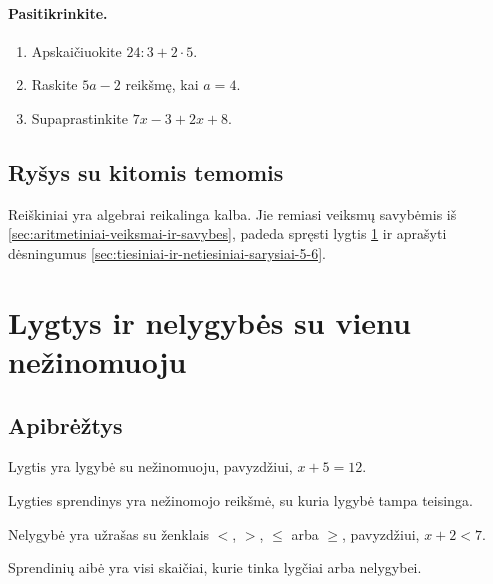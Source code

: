 \paragraph{Pasitikrinkite.}
\begin{enumerate}[label=\arabic*.]
\item Apskaičiuokite \(24:3+2\cdot 5\).
\item Raskite \(5a-2\) reikšmę, kai \(a=4\).
\item Supaprastinkite \(7x-3+2x+8\).
\end{enumerate}

\subsection{Ryšys su kitomis temomis}
Reiškiniai yra algebrai reikalinga kalba. Jie remiasi veiksmų savybėmis iš \ref{sec:aritmetiniai-veiksmai-ir-savybes}, padeda spręsti lygtis \ref{sec:lygtys-ir-nelygybes-su-vienu-nezinomuoju} ir aprašyti dėsningumus \ref{sec:tiesiniai-ir-netiesiniai-sarysiai-5-6}.

\section{Lygtys ir nelygybės su vienu nežinomuoju}\label{sec:lygtys-ir-nelygybes-su-vienu-nezinomuoju}

\subsection{Apibrėžtys}
\begin{apibreztis}
Lygtis yra lygybė su nežinomuoju, pavyzdžiui, \(x+5=12\).
\end{apibreztis}
\begin{apibreztis}
Lygties sprendinys yra nežinomojo reikšmė, su kuria lygybė tampa teisinga.
\end{apibreztis}
\begin{apibreztis}
Nelygybė yra užrašas su ženklais \(<\), \(>\), \(\le\) arba \(\ge\), pavyzdžiui, \(x+2<7\).
\end{apibreztis}
\begin{apibreztis}
Sprendinių aibė yra visi skaičiai, kurie tinka lygčiai arba nelygybei.
\end{apibreztis}

